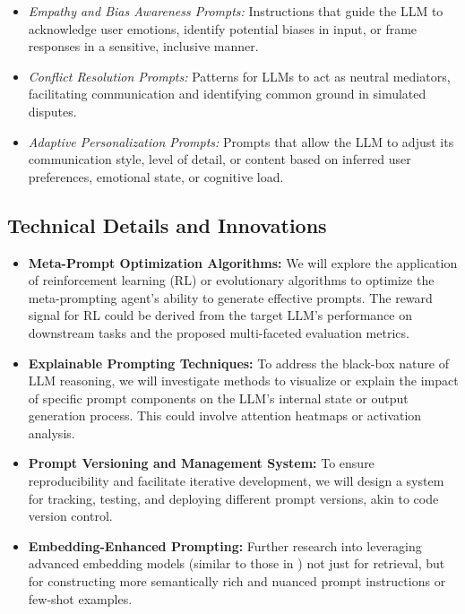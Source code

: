 \documentclass{article}
\begin{document}
\begin{enumerate}
    \begin{itemize}
        \item \textit{Empathy and Bias Awareness Prompts:} Instructions that guide the LLM to acknowledge user emotions, identify potential biases in input, or frame responses in a sensitive, inclusive manner.
        \item \textit{Conflict Resolution Prompts:} Patterns for LLMs to act as neutral mediators, facilitating communication and identifying common ground in simulated disputes.
        \item \textit{Adaptive Personalization Prompts:} Prompts that allow the LLM to adjust its communication style, level of detail, or content based on inferred user preferences, emotional state, or cognitive load.
    \end{itemize}
\end{enumerate}

\subsection{Technical Details and Innovations}
\begin{itemize}
    \item \textbf{Meta-Prompt Optimization Algorithms:} We will explore the application of reinforcement learning (RL) or evolutionary algorithms to optimize the meta-prompting agent's ability to generate effective prompts. The reward signal for RL could be derived from the target LLM's performance on downstream tasks and the proposed multi-faceted evaluation metrics.
    \item \textbf{Explainable Prompting Techniques:} To address the black-box nature of LLM reasoning, we will investigate methods to visualize or explain the impact of specific prompt components on the LLM's internal state or output generation process. This could involve attention heatmaps or activation analysis.
    \item \textbf{Prompt Versioning and Management System:} To ensure reproducibility and facilitate iterative development, we will design a system for tracking, testing, and deploying different prompt versions, akin to code version control.
    \item \textbf{Embedding-Enhanced Prompting:} Further research into leveraging advanced embedding models (similar to those in \cite{PaperFive}) not just for retrieval, but for constructing more semantically rich and nuanced prompt instructions or few-shot examples.
\end{itemize}
\end{document}
